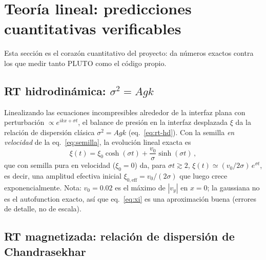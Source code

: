 \documentclass[11pt,a4paper]{article}
\begin{document}
\section{Teoría lineal: predicciones cuantitativas verificables}
\label{sec:lineal}

Esta sección es el corazón cuantitativo del proyecto: da números exactos contra los que
medir tanto PLUTO como el código propio.

\subsection{RT hidrodinámica: $\sigma^2=Agk$}

Linealizando las ecuaciones incompresibles alrededor de la interfaz plana con perturbación
$\propto e^{ikx+\sigma t}$, el balance de presión en la interfaz desplazada $\xi$ da la
relación de dispersión clásica $\sigma^2=Agk$ (eq.~\ref{eq:rt-hd}). Con la semilla
\emph{en velocidad} de la eq.~\eqref{eq:semilla}, la evolución lineal exacta es
\begin{equation}
\xi(t) = \xi_0\cosh(\sigma t)+\frac{v_0}{\sigma}\sinh(\sigma t)\,,
\label{eq:xi}
\end{equation}
que con semilla pura en velocidad ($\xi_0=0$) da, para $\sigma t\gtrsim2$,
$\xi(t)\simeq (v_0/2\sigma)\,e^{\sigma t}$,
es decir, una amplitud efectiva inicial $\xi_{0,\mathrm{eff}}=v_0/(2\sigma)$ que luego crece
exponencialmente. Nota: $v_0=0.02$ es el máximo de $|v_y|$ en $x=0$; la gaussiana no es el
autofunction exacto, así que eq.~\eqref{eq:xi} es una aproximación buena (errores de detalle,
no de escala).

\subsection{RT magnetizada: relación de dispersión de Chandrasekhar}
\label{sec:lineal-mhd}
\end{document}
